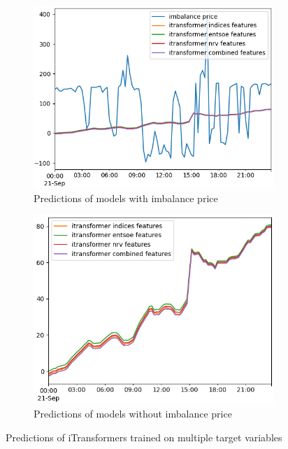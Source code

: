 \documentclass[class=scrbook, crop=false]{standalone}
\begin{document}
\begin{figure}
  \centering
\begin{subfigure}{0.45\textwidth}
  \includegraphics[width=\linewidth]{../images/results/itransformer_target_variables_aep.png}
  \caption{Predictions of models with imbalance price}
  \label{fig:sfig1}
\end{subfigure}
\begin{subfigure}{0.45\textwidth}
  \includegraphics[width=\linewidth]{../images/results/itransformer_target_variables_alone.png}
  \caption{Predictions of models without imbalance price}
  \label{fig:sfig1}
\end{subfigure}
\caption{Predictions of iTransformers trained on multiple target variables}
\label{fig:fig}
\end{figure}
\end{document}
